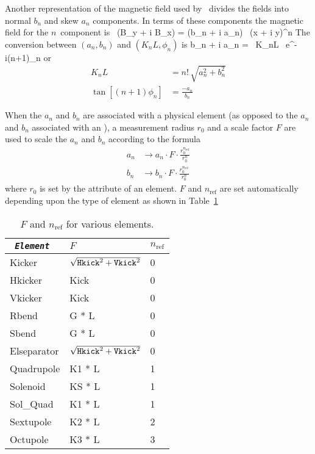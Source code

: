 Another representation of the magnetic field used by \bmad\ divides
the fields into normal $b_n$ and skew $a_n$ components. In terms of
these components the magnetic field for the $n$\Th\ component is
\Begineq
   \, (B_y + i B_x) = (b_n + i a_n) \, (x + i y)^n
\Endeq
The conversion between $(a_n, b_n)$ and $(K_nL, \phi_n)$ is
\Begineq
  b_n + i a_n =  \, K_nL \, e^{-i(n+1)\phi_n}
\Endeq
or
\begin{align}
  K_n L &= n! \, \sqrt{a_n^2 + b_n^2} \\
  \tan[(n+1) \phi_n] &= \frac{-a_n}{b_n}
\end{align}

When the $a_n$ and $b_n$ are associated with a physical element (as
opposed to the $a_n$ and $b_n$ associated with an ),
a measurement radius $r_0$ and a scale factor $F$ are used to scale
the $a_n$ and $b_n$ according to the formula
\begin{align}
  a_n &\rightarrow 
        a_n \cdot F \cdot \frac{r_0^{n_\text{ref}}}{r_0^n} \nonumber \\
  b_n &\rightarrow 
        b_n \cdot F \cdot \frac{r_0^{n_\text{ref}}}{r_0^n}
\end{align}
where $r_0$ is set by the  attribute of an element. $F$ and
$n_\text{ref}$ are set automatically depending upon the type of
element as shown in Table~\ref{t:ab}

\begin{table}[h]
\centering
\begin{tabular}{|l|l|l|} \hline
\tt
  {\em Element} & $F$                              & $n_\text{ref}$ \\ \hline
  Kicker        & $\sqrt{{\tt Hkick}^2 + {\tt Vkick}^2}$ & 0 \\
  Hkicker       & Kick                                   & 0 \\
  Vkicker       & Kick                                   & 0 \\
  Rbend         & G * L                                  & 0 \\
  Sbend         & G * L                                  & 0 \\
  Elseparator   & $\sqrt{{\tt Hkick}^2 + {\tt Vkick}^2}$ & 0 \\
  Quadrupole    & K1 * L                                 & 1 \\
  Solenoid      & KS * L                                 & 1 \\
  Sol\_Quad     & K1 * L                                 & 1 \\
  Sextupole     & K2 * L                                 & 2 \\
  Octupole      & K3 * L                                 & 3 \\ \hline
\end{tabular}
\caption{$F$ and $n_\text{ref}$ for various elements.}
\label{t:ab}
\end{table}

